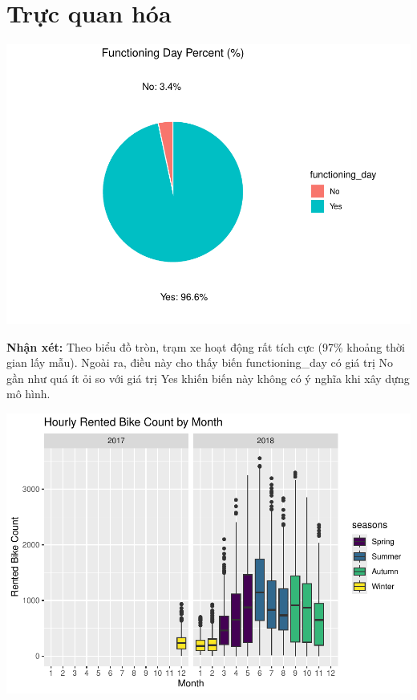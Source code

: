 \documentclass[
  11pt,
  letterpaper,
]{article}
\begin{document}
\section{Trực quan hóa}

\begin{center}\includegraphics[width=1.2\linewidth,]{Final_Project_files/figure-latex/unnamed-chunk-1-1} \end{center}

\textbf{Nhận xét:} Theo biểu đồ tròn, trạm xe hoạt động rất tích cực (97\% khoảng thời gian lấy mẫu). Ngoài ra, điều này cho thấy biến functioning\_day có giá trị No gần như quá ít ỏi so với giá trị Yes khiến biến này không có ý nghĩa khi xây dựng mô hình.

\begin{center}\includegraphics[width=1.2\linewidth,]{Final_Project_files/figure-latex/unnamed-chunk-2-1} \end{center}
\end{document}
